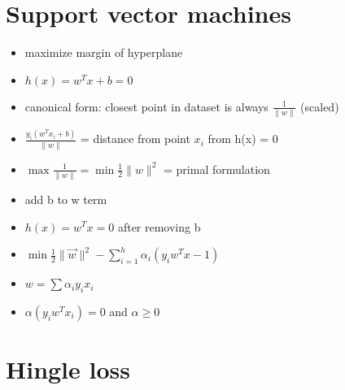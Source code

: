 \documentclass[11pt]{article}
\author{David Lewis}
\date{\today}
\title{}
\begin{document}
\tableofcontents

\section{Support vector machines}
\label{sec:org3ede74c}
\begin{itemize}
\item maximize margin of hyperplane
\item \(h(x) = w^Tx + b = 0\)
\item canonical form: closest point in dataset is always \(\frac{1}{\|w\|}\) (scaled)
\item \(\frac{y_i(w^Tx_i+b)}{\|w\|}\) = distance from point \(x_i\) from h(x) = 0
\item \(\max\frac{1}{\|w\|} = \min\frac{1}{2}\|w\|^2\) = primal formulation
\item add b to w term
\item \(h(x) = w^Tx = 0\) after removing b
\item \(\min \frac{1}{2}\|\vec w\|^2 - \sum^h_{i=1}\alpha_i(y_iw^Tx - 1)\)
\item \(w = \sum\alpha_iy_ix_i\)
\item \(\alpha(y_iw^Tx_i) = 0\) and \(\alpha \ge 0\)
\end{itemize}
\section{Hingle loss}
\label{sec:orgddfc887}
\end{document}
